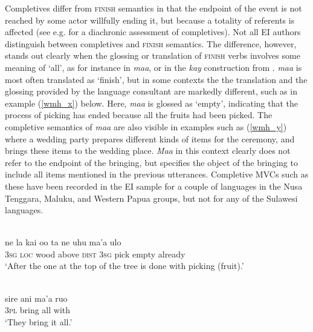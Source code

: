 Completives differ from \textsc{finish} semantics in that the endpoint of the event is not reached by some actor willfully ending it, but because a totality of referents is affected (see e.g. \citealt{bybee1994evolution} for a diachronic assessment of completives). Not all EI authors distinguish between completives and \textsc{finish} semantics. The difference, however, stands out clearly when the glossing or translation of \textsc{finish} verbs involves some meaning of `all', as for instance in  \textit{maa}, or in the  \textit{kay} construction from .  \textit{maa} is most often translated as `finish', but in some contexts the the translation and the glossing provided by the language consultant are markedly different, such as in example (\ref{wmh_x}) below. Here, \textit{maa} is glossed as `empty', indicating that the process of picking has ended because all the fruits had been picked. The completive semantics of \textit{maa} are also visible in examples such as (\ref{wmh_y}) where a wedding party prepares different kinds of items for the ceremony, and brings these items to the wedding place. \textit{Maa} in this context clearly does not refer to the endpoint of the bringing, but specifies the object of the bringing to include all items mentioned in the previous utterances. Completive MVCs such as these have been recorded in the EI sample for a couple of languages in the Nusa Tenggara, Maluku, and Western Papua groups, but not for any of the Sulawesi languages.

\ea \label{wmh_x}
\\
\gll ne la kai oo ta ne uhu ma'a ulo \\
3\textsc{sg} \textsc{loc} wood above \textsc{dist} 3\textsc{sg} pick empty already \\
\glft `After the one at the top of the tree is done with picking (fruit).'\\ 
\z

\ea \label{wmh_y}
\\
\gll sire ani ma'a  ruo \\
3\textsc{pl} bring all with \\
\glft `They bring it all.'\\ 
\z

